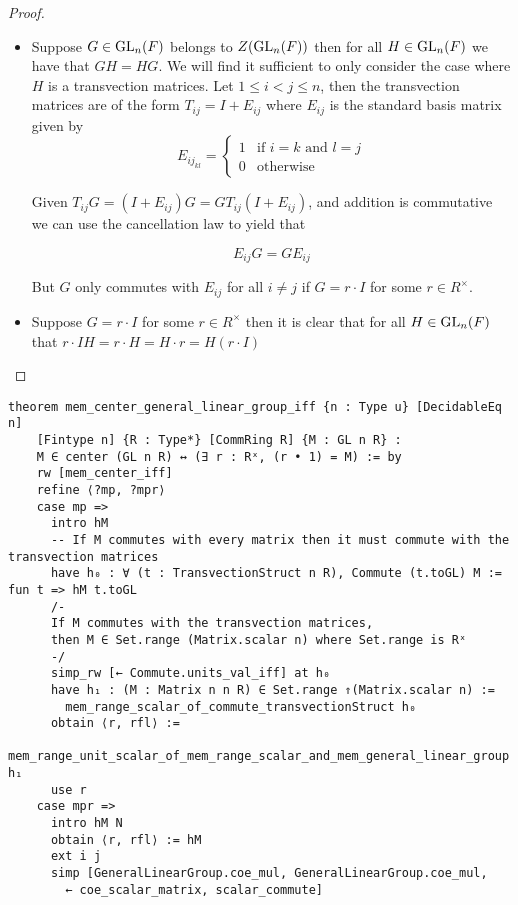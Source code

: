     \begin{proof}
        \leanok
        \begin{itemize}
        \item Suppose $G \in \operatorname{GL}_n(F)$ belongs to $Z(\operatorname{GL}_n(F))$ then for all $H \in \operatorname{GL}_n(F)$ we have that $G H = H G$. We will find it sufficient to only consider the case where $H$ is a transvection matrices.
        Let $1 \leq i < j \leq n$, then the transvection matrices are of the form $T_{ij} = I + E_{ij}$ where $E_{ij}$ is the standard basis matrix given by
        \[
        E_{{ij}_{kl}} = \begin{cases}
        1 & \text{if $i = k$ and $l = j$}\\
        0 & \text{otherwise}
        \end{cases}
        \] 
    
        Given $T_{ij} G = (I + E_{ij}) G = G T_{ij} (I + E_{ij})$, and addition is commutative we can use the cancellation law to yield that
        
        \[
        E_{ij} G = G E_{ij}
        \]
    
        But $G$ only commutes with $E_{ij}$ for all $i \neq j$ if $G = r \cdot I$ for some $r \in R^\times$.
        
        \item Suppose $G = r \cdot I$ for some $r \in R^\times$ then it is clear that for all $H \in \operatorname{GL}_n(F)$ that $r \cdot I  H = r \cdot H = H \cdot r = H (r \cdot I)$
        \end{itemize}
    \end{proof}
\begin{footnotesize}
\begin{verbatim}
theorem mem_center_general_linear_group_iff {n : Type u} [DecidableEq n]
    [Fintype n] {R : Type*} [CommRing R] {M : GL n R} :
    M ∈ center (GL n R) ↔ (∃ r : Rˣ, (r • 1) = M) := by
    rw [mem_center_iff]
    refine ⟨?mp, ?mpr⟩
    case mp =>
      intro hM
      -- If M commutes with every matrix then it must commute with the transvection matrices
      have h₀ : ∀ (t : TransvectionStruct n R), Commute (t.toGL) M := fun t => hM t.toGL
      /-
      If M commutes with the transvection matrices,
      then M ∈ Set.range (Matrix.scalar n) where Set.range is Rˣ
      -/
      simp_rw [← Commute.units_val_iff] at h₀
      have h₁ : (M : Matrix n n R) ∈ Set.range ⇑(Matrix.scalar n) :=
        mem_range_scalar_of_commute_transvectionStruct h₀
      obtain ⟨r, rfl⟩ :=
        mem_range_unit_scalar_of_mem_range_scalar_and_mem_general_linear_group h₁
      use r
    case mpr =>
      intro hM N
      obtain ⟨r, rfl⟩ := hM
      ext i j
      simp [GeneralLinearGroup.coe_mul, GeneralLinearGroup.coe_mul,
        ← coe_scalar_matrix, scalar_commute]
\end{verbatim}
\end{footnotesize}

